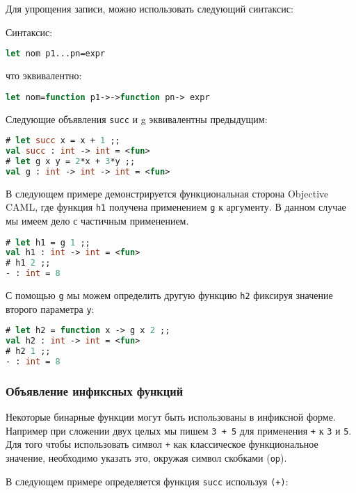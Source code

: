 Для упрощения записи, можно использовать следующий синтаксис:

Синтаксис:

\begin{lstlisting}[language=OCaml]
let nom p1...pn=expr
\end{lstlisting}

что эквивалентно:

\begin{lstlisting}[language=OCaml]
let nom=function p1->->function pn-> expr
\end{lstlisting}

Следующие объявления \texttt{succ} и g эквивалентны предыдущим:

\begin{lstlisting}[language=OCaml]
# let succ x = x + 1 ;;
val succ : int -> int = <fun>
# let g x y = 2*x + 3*y ;;
val g : int -> int -> int = <fun>
\end{lstlisting}

В следующем примере демонстрируется функциональная сторона Objective CAML, где
функция \texttt{h1} получена применением \texttt{g} к аргументу. В данном случае
мы имеем дело с частичным применением.

\begin{lstlisting}[language=OCaml]
# let h1 = g 1 ;;
val h1 : int -> int = <fun>
# h1 2 ;;
- : int = 8
\end{lstlisting}

С помощью \texttt{g} мы можем определить другую функцию \texttt{h2} фиксируя
значение второго параметра \texttt{y}:

\begin{lstlisting}[language=OCaml]
# let h2 = function x -> g x 2 ;;
val h2 : int -> int = <fun>
# h2 1 ;;
- : int = 8
\end{lstlisting}

\subsubsection{Объявление инфиксных функций}

Некоторые бинарные функции могут быть использованы в инфиксной форме. Например
при сложении двух целых мы пишем \texttt{3 + 5} для применения \texttt{+} к
\texttt{3} и \texttt{5}. Для того чтобы использовать символ \texttt{+} как
классическое функциональное значение, необходимо указать это, окружая символ
скобками (\texttt{op}).

В следующем примере определяется функция \texttt{succ} используя \texttt{(+)}:

